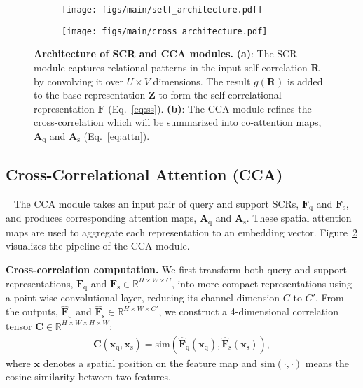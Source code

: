 \documentclass[10pt,twocolumn,letterpaper]{article}
\newcommand{\Real}{\mathbb{R}}
\newcommand{\bC}{\mathbf{C}}
\newcommand{\bF}{\mathbf{F}}
\newcommand{\bA}{\mathbf{A}}
\newcommand{\bx}{\mathbf{x}}
\newcommand{\bZ}{\mathbf{Z}}
\newcommand{\bR}{\mathbf{R}}
\newcommand{\texts}{{\text{s}}}
\newcommand{\textq}{{\text{q}}}
\newcommand{\abbself}{SCR\xspace}
\newcommand{\abbcross}{CCA\xspace}
\newcommand{\smallbreakparagraph}[1]{\smallbreak \noindent \textbf{#1}}
\begin{document}
\begin{figure}[t!]
\begin{subfigure}[t]{.49\linewidth}
\texttt{[image: figs/main/self\_architecture.pdf]}
\captionlistentry{}
\label{fig:self_architecture}
\end{subfigure}
\hfill
\begin{subfigure}[t]{.49\linewidth}
\texttt{[image: figs/main/cross\_architecture.pdf]}
\captionlistentry{}
\label{fig:cross_architecture}
\end{subfigure}
\vspace{-3mm}
\caption{
\textbf{Architecture of \abbself and \abbcross modules.}
\textbf{(a)}: The \abbself module captures relational patterns in the input self-correlation $\bR$ by convolving it over $U \times V$ dimensions.
The result $g(\bR)$ is added to the base representation $\bZ$ to form the self-correlational representation $\bF$ (Eq.~\ref{eq:ss}).
\textbf{(b)}: The \abbcross module refines the cross-correlation which will be summarized into co-attention maps, $\bA_\textq$ and $\bA_\texts$ (Eq.~\ref{eq:attn}).
\label{fig:self_cross_architecture}
}
\vspace{-2mm}
\end{figure}








\subsection{Cross-Correlational Attention (\abbcross)}~\label{sec_CCA}
The \abbcross module takes an input pair of query and support SCRs, $\bF_\textq$ and $\bF_\texts$, and produces corresponding attention maps, $\bA_\textq$ and $\bA_\texts$.
These spatial attention maps are used to aggregate each representation to an embedding vector.
Figure~\ref{fig:cross_architecture} visualizes the pipeline of the \abbcross module.








\smallbreakparagraph{Cross-correlation computation.}
We first transform both query and support representations, $\bF_{\textq}$ and $\bF_{\texts}\in \Real^{H \times W \times C}$, into more compact representations using a point-wise convolutional layer, reducing its channel dimension $C$ to $C'$.
From the outputs, $\hat{\bF}_{\textq}$ and $ \hat{\bF}_{\texts} \in \Real^{H \times W \times C'}$, we construct a 4-dimensional correlation tensor $\bC\in\Real^{H \times W \times H \times W}$:
\begin{eqnarray}
    \bC(\bx_\textq, \bx_\texts) = \mathrm{sim}(\hat{\bF}_\textq(\bx_\textq),\hat{\bF}_\texts(\bx_\texts)),
    \label{eq:cross_correlation}
\end{eqnarray}
where $\bx$ denotes a spatial position on the feature map and $\mathrm{sim}(\cdot, \cdot)$ means the cosine similarity between two features.
\end{document}
